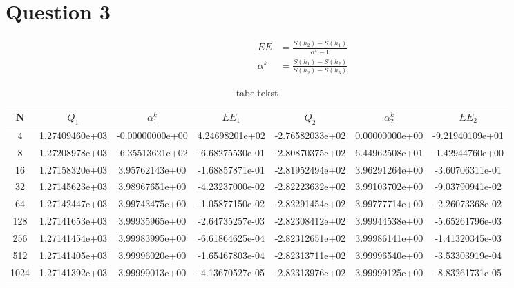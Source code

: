 \newpage
\section*{Question 3}

\begin{equation}
\begin{align*}
EE&=\frac { S\left( h_{ 2 } \right) -S\left( h_{ 1 } \right)  }{ \alpha ^{ k }-1 } \\ 
\alpha ^{ k }&=\frac { S\left( h_{ 1 } \right) -S\left( h_{ 2 } \right)  }{ S\left( h_{ 2 } \right) -S\left( h_{ 3 } \right)  } 
\end{align*}
\label{eq:Q12}
\end{equation}



\begin{table}[th!]
\centering
\begin{tabular}{c|c|c|c|c|c|c}
 N &  \( Q_1 \) & \( { \alpha }_{  1}^{ k } \) & \(  EE_1 \) & \( Q_2 \) & \(  { \alpha }_{  2}^{ k } \) & \( EE_2 \)  \\\hline
4&1.27409460e+03&-0.00000000e+00&4.24698201e+02&-2.76582033e+02&0.00000000e+00&-9.21940109e+01\\
8&1.27208978e+03&-6.35513621e+02&-6.68275530e-01&-2.80870375e+02&6.44962508e+01&-1.42944760e+00\\
16&1.27158320e+03&3.95762143e+00&-1.68857871e-01&-2.81952494e+02&3.96291264e+00&-3.60706311e-01\\
32&1.27145623e+03&3.98967651e+00&-4.23237000e-02&-2.82223632e+02&3.99103702e+00&-9.03790941e-02\\
64&1.27142447e+03&3.99743475e+00&-1.05877150e-02&-2.82291454e+02&3.99777714e+00&-2.26073368e-02\\
128&1.27141653e+03&3.99935965e+00&-2.64735257e-03&-2.82308412e+02&3.99944538e+00&-5.65261796e-03\\
256&1.27141454e+03&3.99983995e+00&-6.61864625e-04&-2.82312651e+02&3.99986141e+00&-1.41320345e-03 \\
512&1.27141405e+03&3.99996020e+00&-1.65467803e-04&-2.82313711e+02&3.99996540e+00&-3.53303919e-04 \\
1024&1.27141392e+03&3.99999013e+00&-4.13670527e-05&-2.82313976e+02&3.99999125e+00&-8.83261731e-05 \\
\end{tabular}
\caption[tekst i indholdsfortegnelsen]{tabeltekst}
\label{tb:resultater}
\end{table}

